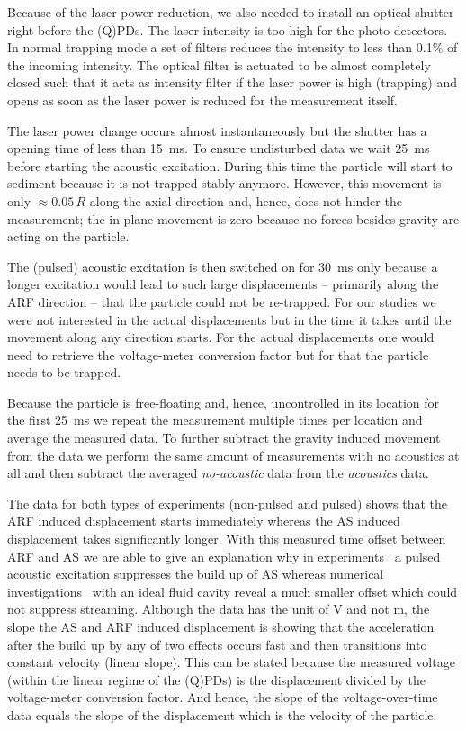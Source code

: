 Because of the laser power reduction, we also needed to install an optical 
shutter right before the (Q)PDs. The laser intensity is too high for the photo 
detectors. In normal trapping mode a set of filters reduces the intensity to 
less than 0.1\% of the incoming intensity. The optical filter is actuated to be 
almost completely closed such that it acts as intensity filter if the laser 
power is high (trapping) and opens as soon as the laser power is reduced for 
the measurement itself.

The laser power change occurs almost instantaneously but the shutter has a 
opening time of less than \SI{15}{\ms}. To ensure undisturbed data we wait 
\SI{25}{\ms} before starting the acoustic excitation. During this time the 
particle will start to sediment because it is not trapped stably anymore. 
However, this movement is only $\approx 0.05\,R$ along the axial direction and, 
hence, does not hinder the measurement; the in-plane movement is zero because 
no forces besides gravity are acting on the particle.

The (pulsed) acoustic excitation is then switched on for \SI{30}{\ms} only 
because a longer excitation would lead to such large displacements -- primarily 
along the ARF direction -- that the particle could not be re-trapped. For our 
studies we were not interested in the actual displacements but in the time it 
takes until the movement along any direction starts. For the actual 
displacements one would need to retrieve the voltage-meter conversion factor 
but for that the particle needs to be trapped.

Because the particle is free-floating and, hence, uncontrolled in its location 
for the first \SI{25}{\ms} we repeat the measurement multiple times per 
location and average the measured data. To further subtract the gravity induced 
movement from the data we perform the same amount of measurements with no 
acoustics at all and then subtract the averaged \emph{no-acoustic} data from 
the \emph{acoustics} data.

The data for both types of experiments (non-pulsed and pulsed) shows that the 
ARF induced displacement starts immediately whereas the AS induced displacement 
takes significantly longer. With this measured time offset between ARF and AS 
we are able to give an explanation why in 
experiments~\cite{Castro2016,Hoyos2013} a pulsed acoustic excitation suppresses 
the build up of AS whereas numerical investigations~\cite{Muller2015} with an 
ideal fluid cavity reveal a much smaller offset which could not suppress 
streaming. Although the data has the unit of \si{\volt} and not \si{\meter}, 
the slope the AS and ARF induced displacement is showing that the acceleration 
after the build up by any of two effects occurs fast and then transitions into 
constant velocity (linear slope). This can be stated because the measured 
voltage (within the linear regime of the (Q)PDs) is the displacement divided by 
the voltage-meter conversion factor. And hence, the slope of the 
voltage-over-time data equals the slope of the displacement which is the 
velocity of the particle.

